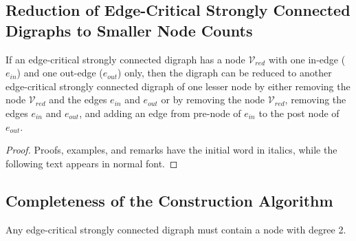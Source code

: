 \documentclass[runningheads]{llncs}
\begin{document}
\subsection{Reduction of Edge-Critical Strongly Connected Digraphs to Smaller Node Counts}

\begin{theorem}
If an edge-critical strongly connected digraph has a node $\mathcal{V}_{red}$ with one in-edge ($e_{in}$) and one out-edge ($e_{out}$) only, then the digraph can be reduced to another edge-critical strongly connected digraph of one lesser node by either removing the node $\mathcal{V}_{red}$ and the edges $e_{in}$ and $e_{out}$ or by removing the node $\mathcal{V}_{red}$, removing the edges $e_{in}$ and $e_{out}$, and adding an edge from pre-node of $e_{in}$ to the post node of $e_{out}$.
\end{theorem}

\begin{proof}
Proofs, examples, and remarks have the initial word in italics,
while the following text appears in normal font.
\end{proof}

\subsection{Completeness of the Construction Algorithm}

\begin{theorem}
Any edge-critical strongly connected digraph must contain a node with degree 2.
\end{theorem}
\end{document}
